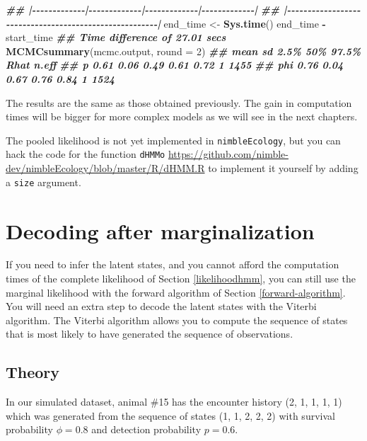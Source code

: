 \documentclass[
  12pt,
]{krantz}
\newenvironment{Shaded}{\begin{snugshade}}{\end{snugshade}}
\newcommand{\AttributeTok}[1]{\textcolor[rgb]{0.13,0.29,0.53}{#1}}
\newcommand{\DecValTok}[1]{\textcolor[rgb]{0.00,0.00,0.81}{#1}}
\newcommand{\DocumentationTok}[1]{\textcolor[rgb]{0.56,0.35,0.01}{\textbf{\textit{#1}}}}
\newcommand{\FunctionTok}[1]{\textcolor[rgb]{0.13,0.29,0.53}{\textbf{#1}}}
\newcommand{\NormalTok}[1]{#1}
\newcommand{\OtherTok}[1]{\textcolor[rgb]{0.56,0.35,0.01}{#1}}
\newcommand{\SpecialCharTok}[1]{\textcolor[rgb]{0.81,0.36,0.00}{\textbf{#1}}}
\begin{document}
\begin{Shaded}
\begin{Highlighting}[]
\DocumentationTok{\#\# |{-}{-}{-}{-}{-}{-}{-}{-}{-}{-}{-}{-}{-}|{-}{-}{-}{-}{-}{-}{-}{-}{-}{-}{-}{-}{-}|{-}{-}{-}{-}{-}{-}{-}{-}{-}{-}{-}{-}{-}|{-}{-}{-}{-}{-}{-}{-}{-}{-}{-}{-}{-}{-}|}
\DocumentationTok{\#\# |{-}{-}{-}{-}{-}{-}{-}{-}{-}{-}{-}{-}{-}{-}{-}{-}{-}{-}{-}{-}{-}{-}{-}{-}{-}{-}{-}{-}{-}{-}{-}{-}{-}{-}{-}{-}{-}{-}{-}{-}{-}{-}{-}{-}{-}{-}{-}{-}{-}{-}{-}{-}{-}{-}{-}|}
\NormalTok{end\_time }\OtherTok{\textless{}{-}} \FunctionTok{Sys.time}\NormalTok{()}
\NormalTok{end\_time }\SpecialCharTok{{-}}\NormalTok{ start\_time}
\DocumentationTok{\#\# Time difference of 27.01 secs}
\FunctionTok{MCMCsummary}\NormalTok{(mcmc.output, }\AttributeTok{round =} \DecValTok{2}\NormalTok{)}
\DocumentationTok{\#\#     mean   sd 2.5\%  50\% 97.5\% Rhat n.eff}
\DocumentationTok{\#\# p   0.61 0.06 0.49 0.61  0.72    1  1455}
\DocumentationTok{\#\# phi 0.76 0.04 0.67 0.76  0.84    1  1524}
\end{Highlighting}
\end{Shaded}

The results are the same as those obtained previously. The gain in computation times will be bigger for more complex models as we will see in the next chapters.

The pooled likelihood is not yet implemented in \texttt{nimbleEcology}, but you can hack the code for the function \texttt{dHMMo} \url{https://github.com/nimble-dev/nimbleEcology/blob/master/R/dHMM.R} to implement it yourself by adding a \texttt{size} argument.

\section{Decoding after marginalization}\label{decoding}

If you need to infer the latent states, and you cannot afford the computation times of the complete likelihood of Section \ref{likelihoodhmm}, you can still use the marginal likelihood with the forward algorithm of Section \ref{forward-algorithm}. You will need an extra step to decode the latent states with the Viterbi algorithm. The Viterbi algorithm allows you to compute the sequence of states that is most likely to have generated the sequence of observations.

\subsection{Theory}\label{viterbi-theory}

In our simulated dataset, animal \#15 has the encounter history (2, 1, 1, 1, 1) which was generated from the sequence of states (1, 1, 2, 2, 2) with survival probability \(\phi = 0.8\) and detection probability \(p = 0.6\).
\end{document}
